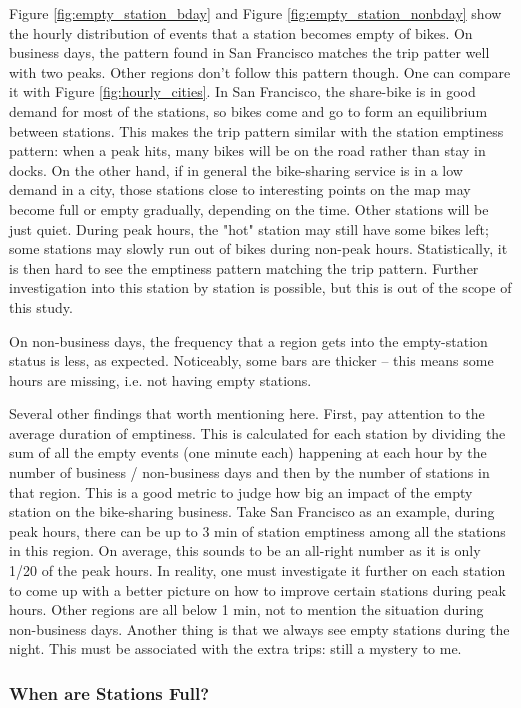 \documentclass[a4paper]{article}
\begin{document}
			Figure \ref{fig:empty_station_bday} and Figure \ref{fig:empty_station_nonbday} show the hourly distribution of events that a station becomes empty of bikes. On business days, the pattern found in San Francisco matches the trip patter well with two peaks. Other regions don't follow this pattern though. One can compare it with Figure \ref{fig:hourly_cities}. In San Francisco, the share-bike is in good demand for most of the stations, so bikes come and go to form an equilibrium between stations. This makes the trip pattern similar with the station emptiness pattern: when a peak hits, many bikes will be on the road rather than stay in docks. On the other hand, if in general the bike-sharing service is in a low demand in a city, those stations close to interesting points on the map may become full or empty gradually, depending on the time. Other stations will be just quiet. During peak hours, the "hot" station may still have some bikes left; some stations may slowly run out of bikes during non-peak hours. Statistically, it is then hard to see the emptiness pattern matching the trip pattern. Further investigation into this station by station is possible, but this is out of the scope of this study.
			
			On non-business days, the frequency that a region gets into the empty-station status is less, as expected. Noticeably, some bars are thicker -- this means some hours are missing, i.e. not having empty stations. 
			
			Several other findings that worth mentioning here. First, pay attention to the average duration of emptiness. This is calculated for each station by dividing the sum of all the empty events (one minute each) happening at each hour by the number of business / non-business days and then by the number of stations in that region. This is a good metric to judge how big an impact of the empty station on the bike-sharing business. Take San Francisco as an example, during peak hours, there can be up to 3 min of station emptiness among all the stations in this region. On average, this sounds to be an all-right number as it is only 1/20 of the peak hours. In reality, one must investigate it further on each station to come up with a better picture on how to improve certain stations during peak hours. Other regions are all below 1 min, not to mention the situation during non-business days. Another thing is that we always see empty stations during the night. This must be associated with the extra trips: still a mystery to me.
			
			\subsubsection{When are Stations Full?}
			
\end{document}
